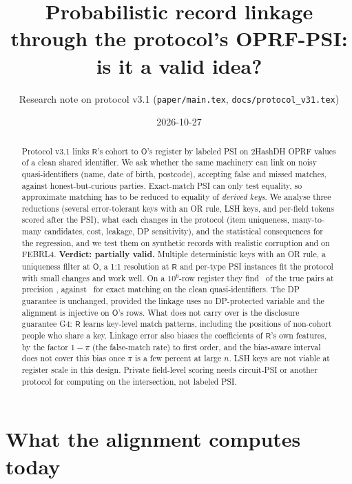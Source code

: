 \documentclass[10pt]{article}
\title{\textbf{Probabilistic record linkage through the protocol's OPRF-PSI:\\ is it a valid idea?}}
\author{Research note on protocol v3.1 (\texttt{paper/main.tex}, \texttt{docs/protocol\_v31.tex})}
\date{2026-10-27}
\newcommand{\Rp}{\mathsf{R}}
\newcommand{\Op}{\mathsf{O}}
\begin{document}
\maketitle

\begin{abstract}
\noindent Protocol v3.1 links $\Rp$'s cohort to $\Op$'s register by labeled PSI on 2HashDH OPRF values of a clean shared identifier. We ask whether the same machinery can link on noisy quasi-identifiers (name, date of birth, postcode), accepting false and missed matches, against honest-but-curious parties. Exact-match PSI can only test equality, so approximate matching has to be reduced to equality of \emph{derived keys}. We analyse three reductions (several error-tolerant keys with an OR rule, LSH keys, and per-field tokens scored after the PSI), what each changes in the protocol (item uniqueness, many-to-many candidates, cost, leakage, DP sensitivity), and the statistical consequences for the regression, and we test them on synthetic records with realistic corruption and on FEBRL4. \textbf{Verdict: partially valid.} Multiple deterministic keys with an OR rule, a uniqueness filter at $\Op$, a 1:1 resolution at $\Rp$ and per-type PSI instances fit the protocol with small changes and work well. On a $10^6$-row register they find \MKrec\ of the true pairs at precision \MKprec, against \EXrec\ for exact matching on the clean quasi-identifiers. The DP guarantee is unchanged, provided the linkage uses no DP-protected variable and the alignment is injective on $\Op$'s rows. What does not carry over is the disclosure guarantee G4: $\Rp$ learns key-level match patterns, including the positions of non-cohort people who share a key. Linkage error also biases the coefficients of $\Rp$'s own features, by the factor $1-\pi$ (the false-match rate) to first order, and the bias-aware interval does not cover this bias once $\pi$ is a few percent at large $n$. LSH keys are not viable at register scale in this design. Private field-level scoring needs circuit-PSI or another protocol for computing on the intersection, not labeled PSI.
\end{abstract}

\tableofcontents

\section{What the alignment computes today}
\label{sec:now}
\end{document}
